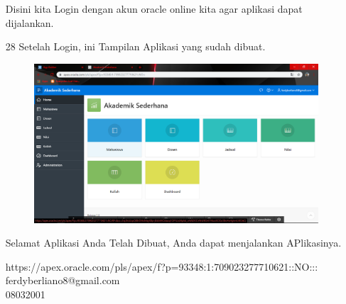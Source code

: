 \begin{enumerate}
\par
Disini kita Login dengan akun oracle online kita agar aplikasi dapat dijalankan.

\newpage
\item[28]Setelah Login, ini Tampilan Aplikasi yang sudah dibuat.

\begin{figure}[!htbp]
    \begin{center}
    \includegraphics[scale=0.3]{figures/40.png}
    \end{center}   
    \end{figure}
    
\par
Selamat Aplikasi Anda Telah Dibuat, Anda dapat menjalankan APlikasinya.

https://apex.oracle.com/pls/apex/f?p=93348:1:709023277710621::NO:::\\
ferdyberliano8@gmail.com\\
08032001
    
\end{enumerate}


